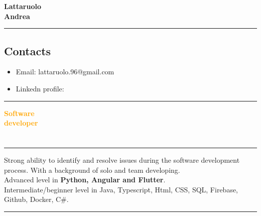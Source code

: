 \documentclass[a4paper,10pt]{article}
\begin{document}
\thispagestyle{empty} %

\noindent
\begin{minipage}[t]{0.25\textwidth}
    \vspace{0.3cm}
    { \LARGE  \textbf{Lattaruolo \\[0.1cm] Andrea}} \\
\end{minipage}
\hfill
\begin{minipage}[t]{0.75\textwidth}
    \rule{\linewidth}{0.5mm} %
    \subsection*{Contacts}
    \begin{itemize}[leftmargin=1cm]
        \item Email: lattaruolo.96@gmail.com
        \item Linkedn profile: 
    \end{itemize}
    \rule{\linewidth}{0.5mm}
\end{minipage}

\begin{minipage}[t]{0.25\textwidth}
    { \LARGE \textbf{\textcolor{orange}{\newline Software \\[0.1cm] developer}}} \\   
    \section*{}
    \rule{0.6cm}{0.3mm}
\end{minipage}
\hfill
\begin{minipage}[t]{0.75\textwidth}
    
    Strong ability to identify and resolve issues during the software development process. With a background of solo and team developing. \\[0.3cm]
    {\large Advanced level in  \textbf{Python, Angular and Flutter}.  \\[0.2cm]
    Intermediate/beginner level in Java, Typescript, Html, CSS, SQL, Firebase, Github, Docker, C\#}.

    \rule{\linewidth}{0.5mm}
\end{minipage}
\end{document}
